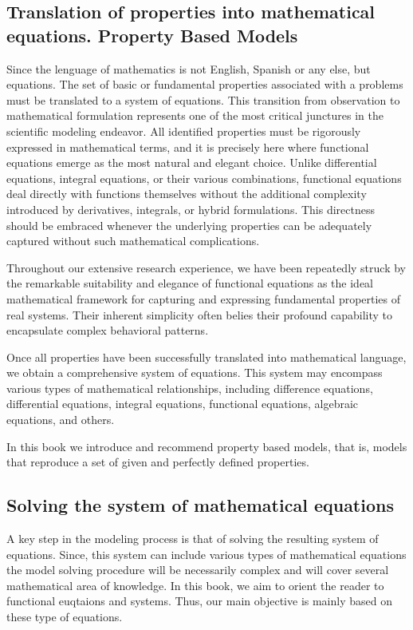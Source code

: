 \subsection{Translation of properties into mathematical equations. Property Based Models}
Since the lenguage of mathematics is not English, Spanish or any else, but equations. The set of basic or fundamental properties associated with a problems must be translated to a system of equations.
This transition from observation to mathematical formulation represents one of the most critical junctures in the scientific modeling endeavor.
All identified properties must be rigorously expressed in mathematical terms, and it is precisely here where functional equations emerge as the most natural and elegant choice. Unlike differential equations, integral equations, or their various combinations, functional equations deal directly with functions themselves without the additional complexity introduced by derivatives, integrals, or hybrid formulations. This directness should be embraced whenever the underlying properties can be adequately captured without such mathematical complications.

Throughout our extensive research experience, we have been repeatedly struck by the remarkable suitability and elegance of functional equations as the ideal mathematical framework for capturing and expressing fundamental properties of real systems. Their inherent simplicity often belies their profound capability to encapsulate complex behavioral patterns.

Once all properties have been successfully translated into mathematical language, we obtain a comprehensive system of equations. This system may encompass various types of mathematical relationships, including difference equations, differential equations, integral equations, functional equations, algebraic equations, and others.

In this book we introduce and recommend property based models, that is, models that reproduce a set of given and perfectly defined properties.

\subsection{Solving the system of mathematical equations}
A key step in the modeling process is that of solving the resulting system of equations. Since, this system can include various types of mathematical equations the model solving procedure will be necessarily complex and will cover several mathematical area of knowledge. In this book, we aim to orient the reader to functional euqtaions and systems. Thus, our main objective is mainly based on these type of equations.


